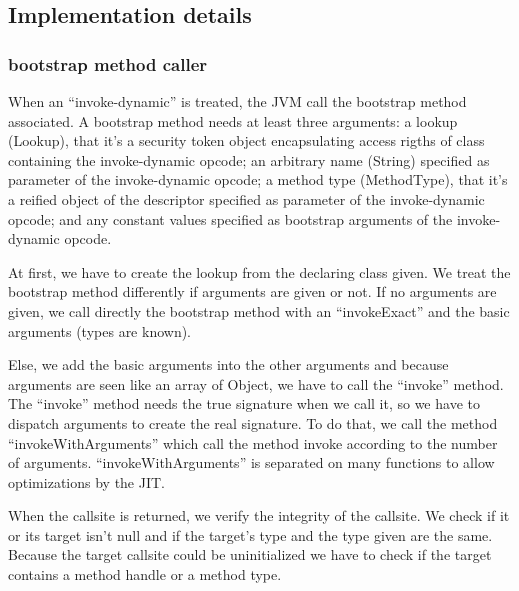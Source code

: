 \documentclass{sigplanconf}
\def \JVM{JVM\xspace}
\begin{document}
    \subsection{Implementation details}

      \subsubsection{bootstrap method caller}

        When an ``invoke-dynamic'' is treated, the \JVM call the bootstrap method associated.%
        A bootstrap method needs at least three arguments:
        a lookup (Lookup), that it's a security token object encapsulating access rigths of class containing the invoke-dynamic opcode;
        an arbitrary name (String) specified as parameter of the invoke-dynamic opcode;
        a method type (MethodType), that it's a reified object of the descriptor specified as parameter of the invoke-dynamic opcode;
        and any constant values specified as bootstrap arguments of the invoke-dynamic opcode.

        

        At first, we have to create the lookup from the declaring class given.
        We treat the bootstrap method differently if arguments are given or not.
        If no arguments are given, we call directly the bootstrap method
        with an ``invokeExact'' and the basic arguments (types are known).

        Else, we add the basic arguments into the other arguments
        and because arguments are seen like an array of Object,
        we have to call the ``invoke'' method.
        The ``invoke'' method needs the true signature when we call it,
        so we have to dispatch arguments to create the real signature.
        To do that, we call the method ``invokeWithArguments''%
        which call the method invoke according to the number of arguments.
        ``invokeWithArguments'' is separated on many functions to allow optimizations by the JIT.

        

        When the callsite is returned, we verify the integrity of the callsite.
        We check if it or its target isn't null and if the target's type and the type given are the same.
        Because the target callsite could be uninitialized we have to check if the target contains a method handle or a method type.
\end{document}

